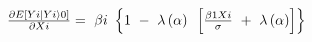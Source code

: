 $\frac{{\partial E\left[ {Yi\left| {Yi} \right\rangle 0} \right]}}{{\partial Xi}} = {\rm{\ }}\beta i{\rm{\ }}\left\{ {1{\rm{\ }} - {\rm{\ }}\lambda \left( \alpha  \right){\rm{\ }}\left[ {\frac{{\beta 1Xi}}{\sigma }{\rm{\ }} + {\rm{\ }}\lambda \left( \alpha  \right)} \right]} \right\}$
